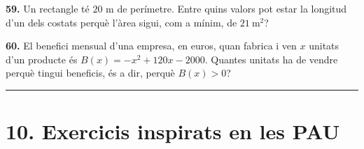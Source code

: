 \documentclass[13pt,a4paper]{extarticle}
\begin{document}
\par\noindent\begin{minipage}{\linewidth}
\textbf{59.} Un rectangle té $20$ m de perímetre. Entre quins valors pot estar la longitud d'un dels costats perquè l'àrea sigui, com a mínim, de $21\ \text{m}^2$?\par
\end{minipage}\par\vspace{1.6mm}
\par\noindent\begin{minipage}{\linewidth}
\textbf{60.} El benefici mensual d'una empresa, en euros, quan fabrica i ven $x$ unitats d'un producte és $B(x)=-x^2+120x-2000$. Quantes unitats ha de vendre perquè tingui beneficis, és a dir, perquè $B(x)>0$?\par
\end{minipage}\par\vspace{1.6mm}

\vspace{1mm}\hrule\vspace{3mm}

\section*{10. Exercicis inspirats en les PAU}
\end{document}
